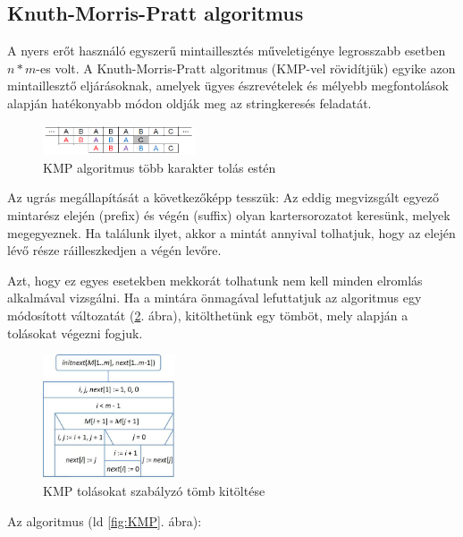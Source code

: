 \documentclass[margin=0px]{article}
\begin{document}
    \subsection*{Knuth-Morris-Pratt algoritmus}

    A nyers erőt használó egyszerű mintaillesztés műveletigénye legrosszabb esetben $n * m$-es volt. A Knuth-Morris-Pratt algoritmus (KMP-vel rövidítjük) egyike azon mintaillesztő eljárásoknak, amelyek ügyes észrevételek és mélyebb megfontolások alapján hatékonyabb módon oldják meg az stringkeresés feladatát.
			
	\begin{figure}[H]
		\centering
		\includegraphics[width=0.4\textwidth]{img/KMP_sample.png}
		\caption{KMP algoritmus több karakter tolás estén}
		\label{fig:KMP_sample}
	\end{figure}
			
    \noindent Az ugrás megállapítását a következőképp tesszük: Az eddig megvizsgált egyező mintarész elején (prefix) és végén (suffix) olyan kartersorozatot keresünk, melyek megegyeznek. Ha találunk ilyet, akkor a mintát annyival tolhatjuk, hogy az elején lévő része ráilleszkedjen a végén levőre.
			
    \noindent Azt, hogy ez egyes esetekben mekkorát tolhatunk nem kell minden elromlás alkalmával vizsgálni. Ha a mintára önmagával lefuttatjuk az algoritmus egy módosított változatát (\ref{fig:KMP_initnext}. ábra), kitölthetünk egy tömböt, mely alapján a tolásokat végezni fogjuk.
			
			\begin{figure}[H]
				\centering
				\includegraphics[width=0.35\textwidth]{img/KMP_init_next.png}
				\caption{KMP tolásokat szabályzó tömb kitöltése}
				\label{fig:KMP_initnext}
			\end{figure}
			
    \noindent Az algoritmus (ld \ref{fig:KMP}. ábra):\\
\end{document}
